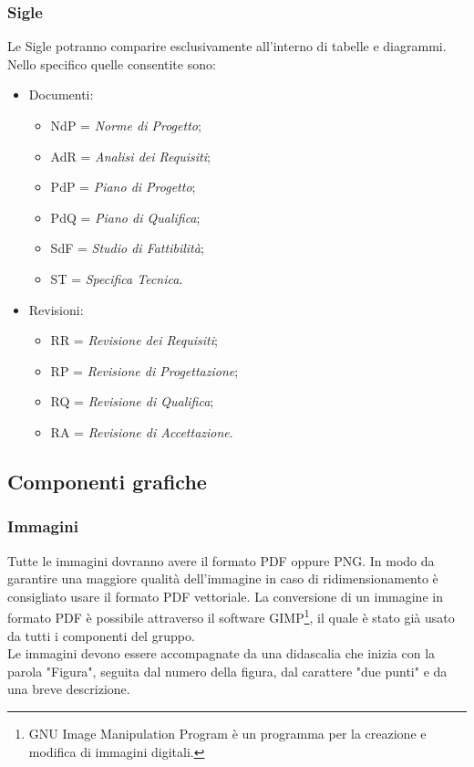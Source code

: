 \subsubsection{Sigle}
Le Sigle potranno comparire esclusivamente all'interno di tabelle e diagrammi. Nello specifico quelle consentite sono: 
\begin{itemize}
	\item Documenti:
	\begin{itemize}
		\item NdP = \textit{Norme di Progetto};
		\item AdR = \textit{Analisi dei Requisiti};
		\item PdP = \textit{Piano di Progetto};
		\item PdQ = \textit{Piano di Qualifica};
		\item SdF = \textit{Studio di Fattibilità};
		\item ST = \textit{Specifica Tecnica}.
	\end{itemize}
	\item Revisioni:
	\begin{itemize}
		\item RR = \textit{Revisione dei Requisiti};
		\item RP = \textit{Revisione di Progettazione};
		\item RQ = \textit{Revisione di Qualifica};
		\item RA = \textit{Revisione di Accettazione}.
	\end{itemize}
\end{itemize}

\subsection{Componenti grafiche}
\subsubsection{Immagini}
Tutte le immagini dovranno avere il formato PDF oppure \gls{PNG}. In modo da garantire una maggiore qualità dell'immagine in caso di ridimensionamento è consigliato usare il formato PDF vettoriale. La conversione di un immagine in formato PDF è possibile attraverso il software GIMP\footnote{GNU Image Manipulation Program è un programma per la creazione e modifica di immagini digitali.}, il quale è stato già usato da tutti  i componenti del gruppo. \\ Le immagini devono essere accompagnate da una didascalia che inizia con la parola "Figura", seguita dal numero della figura, dal carattere "due punti" e da una breve descrizione.
